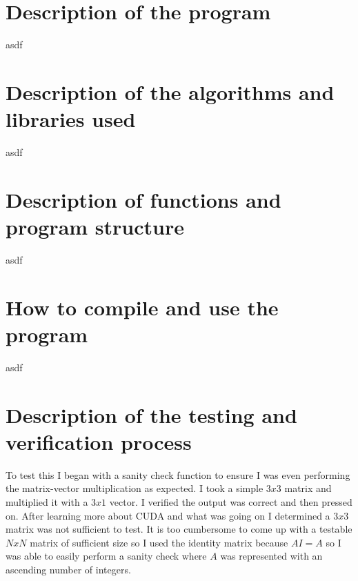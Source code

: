 \documentclass{article}
\title{\textbf{Programming Assignment #2}}
\author{MacMillan, Kyle}
\date{November 12, 2018}
\begin{document}
\maketitle
{}

\newpage
{}   %
\tableofcontents
{}

\newpage
\listoffigures
{}

\listofalgorithms
{}

\newpage
{}  %
\hypersetup{
    colorlinks,
    citecolor=blue,
    filecolor=black,
    linkcolor=blue,
    urlcolor=blue
}

\section{Description of the program}
\setcounter{page}{1} %
asdf


\section{Description of the algorithms and libraries used}
asdf


\section{Description of functions and program structure}
asdf


\section{How to compile and use the program}
asdf

\newpage
\section{Description of the testing and verification process}
To test this I began with a sanity check function to ensure I was even 
performing the matrix-vector multiplication as expected. I took a simple $3x3$ 
matrix and multiplied it with a $3x1$ vector. I verified the output was correct 
and then pressed on. After learning more about CUDA and what was going on I 
determined a $3x3$ matrix was not sufficient to test. It is too cumbersome to 
come up with a testable $N x N$ matrix of sufficient size so I used the identity 
matrix because $AI = A$ so I was able to easily perform a sanity check where $A$ 
was represented with an ascending number of integers. 
\end{document}
